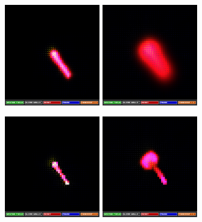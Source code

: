 \documentclass{article}
\begin{document}
\begin{center}
    \begin{minipage}{0.5\linewidth}
        \includegraphics[width=4.1cm]{0_001f_diff_ts_1}
        \includegraphics[width=4.1cm]{0_001f_diff_ts_20}
    \end{minipage}%
    \begin{minipage}{0.5\linewidth}
        \includegraphics[width=4.1cm]{0_00000001f_diff_ts_1}
        \includegraphics[width=4.1cm]{0_00000001f_diff_ts_20}
    \end{minipage}%
\end{center}%
\end{document}
